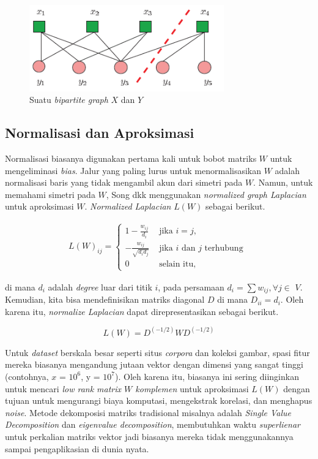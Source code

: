 \begin{figure}[h]
    \centering
    \includegraphics[width=0.75\textwidth]{gambar/Bipartite Graph.PNG}
    \caption{Suatu \textit{bipartite graph} \(X\) dan \(Y\) \cite{song2008autotag}}
    \label{gambar:bipartite_graph}
\end{figure}

\subsection{Normalisasi dan Aproksimasi}

Normalisasi biasanya digunakan pertama kali untuk bobot matriks \(W\) untuk mengeliminasi \textit{bias}. Jalur yang paling lurus untuk menormalisasikan \(W\) adalah normalisasi baris yang tidak mengambil akun dari simetri pada \(W\). Namun, untuk memahami simetri pada \(W\), Song dkk menggunakan \textit{normalized graph Laplacian} untuk aproksimasi \(W\). \textit{Normalized Laplacian} \(L(W)\) sebagai berikut.

\begin{align*}
L(W)_{i j} = \begin{cases}1-\frac{w_{i j}}{d_{i}} & \text { jika } i=j, \\ -\frac{w_{i j}}{\sqrt{d_{i} d_{j}}} & \text { jika } i \text { dan } j \text { terhubung } \\ 0 & \text { selain itu, }\end{cases}
\end{align*}

di mana \(d_i\) adalah \textit{degree} luar dari titik \(i\), pada persamaan $d_{i}=\sum w_{i j}, \forall j \in$ $V$. Kemudian, kita bisa mendefinisikan matriks diagonal \(D\) di mana $D_{ii} = d_i$. Oleh karena itu, \textit{normalize Laplacian} dapat direpresentasikan sebagai berikut. 

\begin{equation}
\label{normalize_laplacian}
    L(W) = D^{(-1/2)}WD^{(-1/2)}
\end{equation}

Untuk \textit{dataset} berskala besar seperti situs \textit{corpora} dan koleksi gambar, spasi fitur mereka biasanya mengandung jutaan vektor dengan dimensi yang sangat tinggi (contohnya, \(x\) = $10^6$, y = $10^7$). Oleh karena itu, biasanya ini sering diinginkan untuk mencari \textit{low rank matrix $W$ komplemen} untuk aproksimasi $L(W)$ dengan tujuan untuk mengurangi biaya komputasi, mengekstrak korelasi, dan menghapus \textit{noise}. Metode dekomposisi matriks tradisional misalnya adalah \textit{Single Value Decomposition} dan \textit{eigenvalue decomposition}, membutuhkan waktu \textit{superlienar} untuk perkalian matriks vektor jadi biasanya mereka tidak menggunakannya sampai pengaplikasian di dunia nyata.

